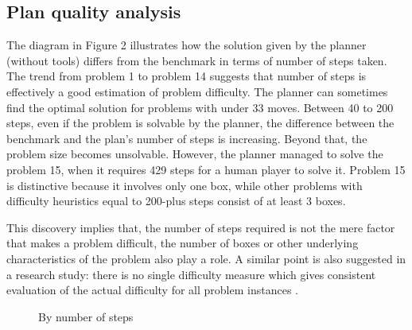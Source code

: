 \documentclass[letterpaper]{article} %
\begin{document}
\subsection{Plan quality analysis}
The diagram in Figure 2 illustrates how the solution given by the
planner (without tools) differs from the benchmark in terms of number
of steps taken. The trend from problem 1 to problem 14
suggests that number of steps is effectively a good estimation of
problem difficulty. The planner can sometimes find the
optimal solution for problems with under 33 moves.
Between 40 to 200 steps, even if the problem is solvable
by the planner, the difference between the benchmark and the
plan's number of steps is increasing.
Beyond that, the problem size becomes
unsolvable. However, the planner managed to solve the
problem 15, when it requires 429 steps for a human player
to solve it.
Problem 15 is distinctive because
it involves only one box, while other problems with difficulty
heuristics equal to
200-plus steps consist of at least 3 boxes.

This discovery implies that, the number of steps required is not
the mere factor that makes a problem difficult, the number of boxes
or other underlying characteristics of the problem also play a role.
A similar point is also suggested in a research study:
there is no single difficulty measure which gives consistent
evaluation of the actual difficulty for all problem instances
\cite{difficulty-rating}.
\datatableentry
\begin{figure}
\caption{By number of steps}
\end{figure}
\end{document}
